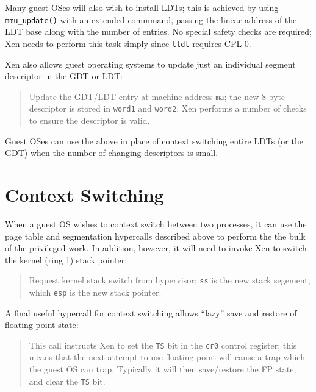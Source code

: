 \documentclass[11pt,twoside,final,openright]{xenstyle}
\begin{document}
Many guest OSes will also wish to install LDTs; this is achieved by
using {\tt mmu\_update()} with an extended commmand, passing the
linear address of the LDT base along with the number of entries. No
special safety checks are required; Xen needs to perform this task
simply since {\tt lldt} requires CPL 0.


Xen also allows guest operating systems to update just an 
individual segment descriptor in the GDT or LDT:  

\begin{quote}

Update the GDT/LDT entry at machine address {\tt ma}; the new
8-byte descriptor is stored in {\tt word1} and {\tt word2}.
Xen performs a number of checks to ensure the descriptor is 
valid. 

\end{quote}

Guest OSes can use the above in place of context switching entire 
LDTs (or the GDT) when the number of changing descriptors is small. 

\section{Context Switching} 

When a guest OS wishes to context switch between two processes, 
it can use the page table and segmentation hypercalls described
above to perform the the bulk of the privileged work. In addition, 
however, it will need to invoke Xen to switch the kernel (ring 1) 
stack pointer: 

\begin{quote} 

Request kernel stack switch from hypervisor; {\tt ss} is the new 
stack segement, which {\tt esp} is the new stack pointer. 

\end{quote} 

A final useful hypercall for context switching allows ``lazy'' 
save and restore of floating point state: 

\begin{quote}

This call instructs Xen to set the {\tt TS} bit in the {\tt cr0}
control register; this means that the next attempt to use floating
point will cause a trap which the guest OS can trap. Typically it will
then save/restore the FP state, and clear the {\tt TS} bit. 
\end{quote} 
\end{document}
